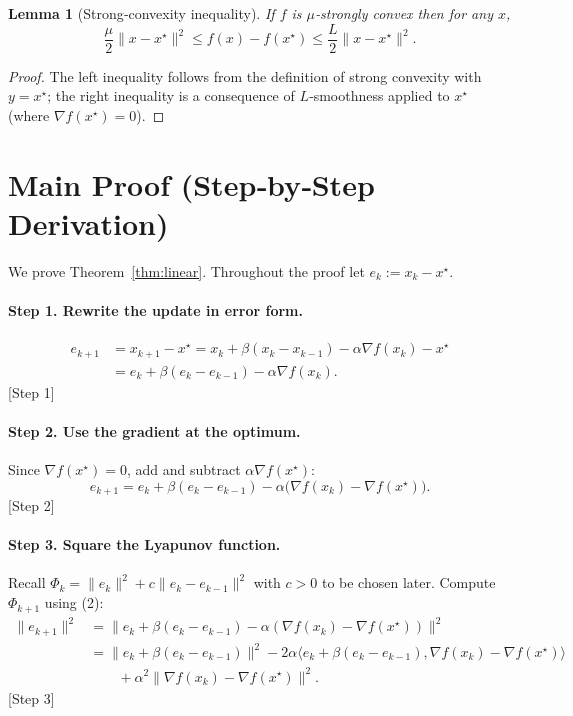 \documentclass{article}
\newtheorem{lemma}{Lemma}
\begin{document}
\begin{lemma}[Strong‑convexity inequality]\label{lem:strong}
If $f$ is $\mu$‑strongly convex then for any $x$,
\[
\frac{\mu}{2}\|x-x^{\star}\|^{2}\le f(x)-f(x^{\star})\le\frac{L}{2}\|x-x^{\star}\|^{2}.
\]
\end{lemma}
\begin{proof}
The left inequality follows from the definition of strong convexity with $y=x^{\star}$; the right inequality is a consequence of $L$‑smoothness applied to $x^{\star}$ (where $\nabla f(x^{\star})=0$). \hfill\qedsymbol
\end{proof}

\section*{Main Proof (Step‑by‑Step Derivation)}
We prove Theorem~\ref{thm:linear}. Throughout the proof let $e_{k}:=x_{k}-x^{\star}$.

\paragraph{Step 1. Rewrite the update in error form.}
\[
\begin{aligned}
e_{k+1}
&=x_{k+1}-x^{\star}
 =x_{k}+\beta (x_{k}-x_{k-1})-\alpha\nabla f(x_{k})-x^{\star}\\
&=e_{k}+\beta(e_{k}-e_{k-1})-\alpha\nabla f(x_{k}). \tag{1}
\end{aligned}
\]
[Step 1]

\paragraph{Step 2. Use the gradient at the optimum.}
Since $\nabla f(x^{\star})=0$, add and subtract $\alpha\nabla f(x^{\star})$:
\[
e_{k+1}=e_{k}+\beta(e_{k}-e_{k-1})-\alpha\bigl(\nabla f(x_{k})-\nabla f(x^{\star})\bigr). \tag{2}
\]
[Step 2]

\paragraph{Step 3. Square the Lyapunov function.}
Recall $\Phi_{k}= \|e_{k}\|^{2}+c\|e_{k}-e_{k-1}\|^{2}$ with $c>0$ to be chosen later.  
Compute $\Phi_{k+1}$ using (2):
\[
\begin{aligned}
\|e_{k+1}\|^{2}
&=\|e_{k}+\beta(e_{k}-e_{k-1})-\alpha(\nabla f(x_{k})-\nabla f(x^{\star}))\|^{2}\\
&= \|e_{k}+\beta(e_{k}-e_{k-1})\|^{2}
   -2\alpha\langle e_{k}+\beta(e_{k}-e_{k-1}),\nabla f(x_{k})-\nabla f(x^{\star})\rangle\\
&\qquad+\alpha^{2}\|\nabla f(x_{k})-\nabla f(x^{\star})\|^{2}. \tag{3}
\end{aligned}
\]
[Step 3]
\end{document}
